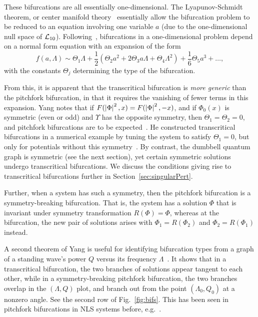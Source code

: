 \documentclass{article}
\numberwithin{equation}{section}
\numberwithin{figure}{section}
\begin{document}
These bifurcations are all essentially one-dimensional. The Lyapunov-Schmidt theorem, or center manifold theory~\cite{Golubitsky:2013aa} essentially allow the bifurcation problem to be reduced to an equation involving one variable $a$ (due to the one-dimensional null space of $\mathcal{L}_{10}$). Following~\cite{Glendinning:1994ub}, bifurcations in a one-dimensional problem depend on a normal form equation with an expansion of the form
\begin{equation*}
f(a,\Lambda) \sim \Theta_1 \Lambda + \frac{1}{2} 
\left(
\Theta_2 a^2 + 2 \Theta_3 a \Lambda  + \Theta_4 \Lambda^2 
\right)
+ \frac{1}{6} \Theta_5 a^3 + \ldots,
\end{equation*}
with the constants $\Theta_j$ determining the type of the bifurcation.

\begin{rem}
\label{rem:generic}
From this, it is apparent that the transcritical bifurcation is \emph{more generic} than the pitchfork bifurcation, in that it requires the vanishing of fewer terms in this expansion. 
Yang notes that if $F(\left\lvert\Phi\right\rvert^2,x)=F(\left\lvert\Phi\right\rvert^2,-x)$, and if $\Phi_0(x)$ is symmetric (even or odd) and $\Upsilon$ has the opposite symmetry, then $\Theta_1=\Theta_2=0$, and pitchfork bifurcations are to be expected~\cite[Remark 2]{Yang:2012ux}. He constructed transcritical bifurcations in a numerical example by tuning the system to satisfy $\Theta_1=0$, but only for potentials without this symmetry~\cite{Yang:2018}. By contrast, the dumbbell quantum graph is symmetric (see the next section), yet certain symmetric solutions undergo transcritical bifurcations. We discuss the conditions giving rise to transcritical bifurcations further in Section~\ref{sec:singularPert}.

Further, when a system has such a symmetry, then the pitchfork bifurcation is a symmetry-breaking bifurcation. That is, the system has a solution $\Phi$ that is invariant under symmetry transformation $R(\Phi)=\Phi$, whereas at the bifurcation, the new pair of solutions arises with $\Phi_1 = R(\Phi_2)$ and $\Phi_2 = R(\Phi_1)$ instead.
\end{rem}

\begin{rem}
A second theorem of Yang is useful for identifying bifurcation types from a graph of a standing wave's power $Q$ versus its frequency $\Lambda$~\cite{Yang:2012ux}. It shows that in a transcritical bifurcation, the two branches of solutions appear tangent to each other, while in a symmetry-breaking pitchfork bifurcation, the two branches overlap in the $(\Lambda,Q)$ plot, and branch out from the point $(\Lambda_0,Q_0)$ at a nonzero angle. See the second row of Fig.~\ref{fig:bifs}. This has been seen in pitchfork bifurcations in NLS systems before, e.g.~\cite{Marzuola:2010fl,Pelinovsky:2012hb}.
\end{rem}
\end{document}
